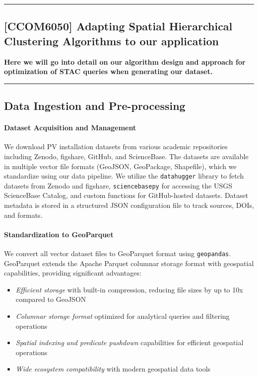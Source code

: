 {\color{gray}\hrule}
\begin{center}
\section{[CCOM6050] Adapting Spatial Hierarchical Clustering Algorithms to our application}
\textbf{Here we will go into detail on our algorithm design and approach for optimization of STAC queries when generating our dataset.}
\bigskip
\end{center}
{\color{gray}\hrule}

\begin{multicols}{2}

\subsection{Data Ingestion and Pre-processing}

\paragraph{Dataset Acquisition and Management} 
We download PV installation datasets from various academic repositories including Zenodo, figshare, GitHub, and ScienceBase. 
The datasets are available in multiple vector file formats (GeoJSON, GeoPackage, Shapefile), which we standardize using our data pipeline. 
We utilize the \texttt{datahugger} library to fetch datasets from Zenodo and figshare, \texttt{sciencebasepy} for accessing the USGS ScienceBase Catalog, 
and custom functions for GitHub-hosted datasets. Dataset metadata is stored in a structured JSON configuration file to track sources, DOIs, and formats. 

\paragraph{Standardization to GeoParquet}
We convert all vector dataset files to GeoParquet format using \texttt{geopandas}. GeoParquet extends the Apache Parquet columnar storage format with geospatial capabilities, providing significant advantages:
\begin{itemize}
    \item \textit{Efficient storage} with built-in compression, reducing file sizes by up to 10x compared to GeoJSON
    \item \textit{Columnar storage format} optimized for analytical queries and filtering operations
    \item \textit{Spatial indexing and predicate pushdown} capabilities for efficient geospatial operations
    \item \textit{Wide ecosystem compatibility} with modern geospatial data tools
\end{itemize}


\end{multicols}
